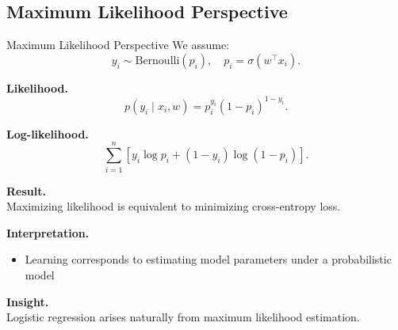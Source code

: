 \documentclass[aspectratio=169,11pt]{beamer}
\begin{document}
\subsection{Maximum Likelihood Perspective}
\begin{frame}[t,allowframebreaks]{Maximum Likelihood Perspective}
\small
We assume:
\[
y_i \sim \text{Bernoulli}(p_i), \quad p_i = \sigma(w^\top x_i).
\]

\textbf{Likelihood.}\\ \[
p(y_i \mid x_i, w) = p_i^{y_i}(1 - p_i)^{1 - y_i}.
\]

\textbf{Log-likelihood.}\\ \[
\sum_{i=1}^n \left[
y_i \log p_i + (1 - y_i)\log(1 - p_i)
\right].
\]

\textbf{Result.}\\ Maximizing likelihood is equivalent to minimizing cross-entropy loss.

\textbf{Interpretation.}\\ \begin{itemize}
    \item Learning corresponds to estimating model parameters under a probabilistic model
\end{itemize}

\textbf{Insight.}\\ Logistic regression arises naturally from maximum likelihood estimation.
\end{frame}
\end{document}
